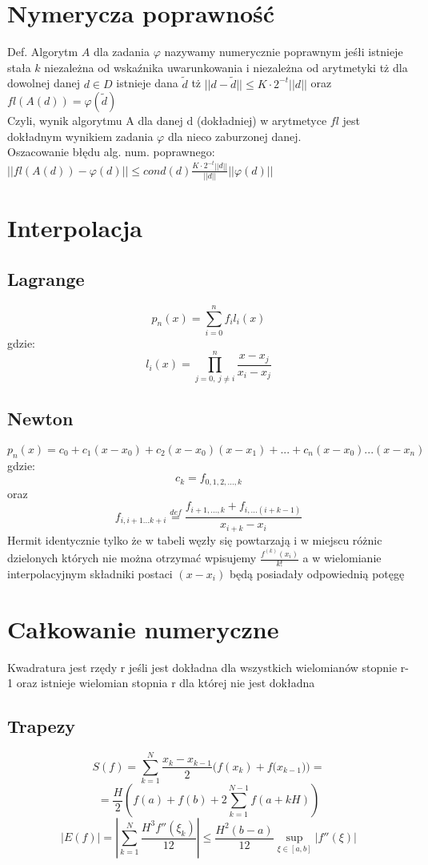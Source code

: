 \documentclass[10pt,twocolumn]{article}
\begin{document}
\begin{flushleft}
\section{Nymerycza poprawność}
Def. Algorytm $A$ dla zadania $\varphi$ nazywamy numerycznie poprawnym jeśłi istnieje stała $k$ niezależna od wskaźnika uwarunkowania i niezależna od arytmetyki tż dla dowolnej danej $d \in D$ istnieje dana $\widetilde{d}$ tż $||d-\widetilde{d}|| \leq K\cdot 2^{-t}||d||$ oraz $fl(A(d)) = \varphi(\widetilde{d})$\\
Czyli, wynik algorytmu A dla danej d (dokładniej) w arytmetyce $fl$ jest dokładnym wynikiem zadania $\varphi$ dla nieco zaburzonej danej.\\
Oszacowanie błędu alg. num. poprawnego:\\
$||fl(A(d)) - \varphi(d)|| \leq cond(d) \frac{K\cdot2^{-t}||d||}{||d||}||\varphi(d)||$

\section{Interpolacja}
\subsection{Lagrange}
$$p_{n}(x) = \sum_{i = 0}^{n}f_{i}l_{i}(x)$$
gdzie: $$l_i(x) = \prod_{{j = 0},\ {j \neq i}}^{n} \frac{x - x_{j}}{x_{i}-x_{j}}$$
\subsection{Newton}
$$p_{n}(x) = c_{0} + c_{1}(x-x_{0}) + c_{2}(x-x_{0})(x-x_{1}) + ... + c_{n}(x-x_{0})...(x-x_{n})$$
gdzie: $$c_{k} = f_{0,1,2,...,k}$$ oraz $$f_{i,i+1...k+i} \stackrel{def}{=} \frac{f_{i+1,...,k} + f_{i,...(i+k-1)}}{x_{i+k}-x_{i}}$$
Hermit identycznie tylko że w tabeli węzły się powtarzają i w miejscu różnic dzielonych których nie można otrzymać wpisujemy $\frac{f^{(k)}(x_i)}{k!}$ a w wielomianie interpolacyjnym składniki postaci $(x-x_i)$ będą posiadały odpowiednią potęgę
\section{Całkowanie numeryczne}
Kwadratura jest rzędy r jeśli jest dokładna dla wszystkich wielomianów stopnie r-1 oraz istnieje wielomian stopnia r dla której nie jest dokładna\\
\subsection{Trapezy}
$$S(f) = \sum_{k=1}^{N} \frac{x_k-x_{k-1}}{2}{(f(x_k)+f(x_{k-1}})) =$$ $$=\frac{H}{2} \left(f(a)+f(b)+2\sum_{k=1}^{N-1}f(a+kH)\right)$$
$$|E(f)| = \left| \sum_{k=1}^{N}\frac{H^3f''(\xi_k)}{12} \right| \leq \frac{H^2(b-a)}{12}\underset{\xi \in [a,b]}{\sup}|f''(\xi)|$$

\end{flushleft}
\end{document}
